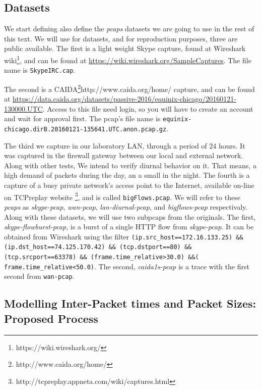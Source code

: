 \subsection{Datasets}

We start defining also define the \textit{pcaps} datasets we are going to use in the rest of this text. We will use for datasets, and for reproduction purposes, three are public available. 
The first is a light weight Skype capture, found at Wireshark wiki\footnote{https://wiki.wireshark.org/}, and can be found at \href{https://wiki.wireshark.org/SampleCaptures}{https://wiki.wireshark.org/SampleCaptures}. The file name is \texttt{SkypeIRC.cap}. 

The second is a CAIDA\footnote{http://www.caida.org/home/}{http://www.caida.org/home/} capture, and can be found at  \href{https://data.caida.org/datasets/passive-2016/equinix-chicago/20160121-130000.UTC}{https://data.caida.org/datasets/passive-2016/equinix-chicago/20160121-130000.UTC}. Access to this file need login, so you will have to create an account and wait for approval first. The pcap's file name is \texttt{equinix-chicago.dirB.20160121-135641.UTC.anon.pcap.gz}. 

The third we capture in our laboratory LAN, through a period of 24 hours. It was captured in the firewall gateway between our local and external network. Along with other tests, We intend to verify diurnal behavior on it. That means, a high demand of packets during the day, an a small in the night. The fourth is a capture of a busy private network's access point to the Internet, available on-line on TCPreplay\cite{web-tcpreplay} website \footnote{ http://tcpreplay.appneta.com/wiki/captures.html}, and is called \texttt{bigFlows.pcap}. We will refer to these \textit{pcaps} as \textit{skype-pcap}, \textit{wan-pcap}, \textit{lan-diurnal-pcap}, and \textit{bigflows-pcap} respectivaly. Along with these datasets, we will use two subpcaps from the originals. The first, \textit{skype-flowburst-pcap}, is a burst of a single HTTP flow from \textit{skype-pcap}. It can be obtained from Wireshark using the filter \texttt{(ip.src\_host==172.16.133.25) \&\& (ip.dst\_host==74.125.170.42) \&\& (tcp.dstport==80) \&\& (tcp.srcport==63378) \&\& (frame.time\_relative>30.0) \&\&( frame.time\_relative<50.0)}. The second, \textit{caida1s-pcap} is a trace with the first second from \texttt{wan-pcap}.


\subsection{Modelling Inter-Packet times and Packet Sizes: Proposed Process}


